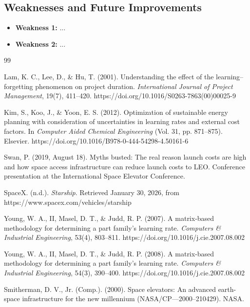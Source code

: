\documentclass{mcmthesis}
\begin{document}
\subsection{Weaknesses and Future Improvements}
\begin{itemize}
    \item \textbf{Weakness 1:} ...
    \item \textbf{Weakness 2:} ...
\end{itemize}

\newpage
\begin{thebibliography}{99}

    Lam, K. C., Lee, D., \& Hu, T. (2001).
    Understanding the effect of the learning--forgetting phenomenon on project duration.
    \textit{International Journal of Project Management}, 19(7), 411--420.
    https://doi.org/10.1016/S0263-7863(00)00025-9

    Kim, S., Koo, J., \& Yoon, E. S. (2012).
    Optimization of sustainable energy planning with consideration of uncertainties in learning rates and external cost factors.
    In \textit{Computer Aided Chemical Engineering} (Vol. 31, pp. 871--875).
    Elsevier.
    https://doi.org/10.1016/B978-0-444-54298-4.50161-6

    Swan, P. (2019, August 18).
    Myths busted: The real reason launch costs are high and how space access infrastructure can reduce launch costs to LEO.
    Conference presentation at the International Space Elevator Conference.

    SpaceX. (n.d.).
    \textit{Starship}.
    Retrieved January 30, 2026, from https://www.spacex.com/vehicles/starship

    Young, W. A., II, Masel, D. T., \& Judd, R. P. (2007).
    A matrix-based methodology for determining a part family’s learning rate.
    \textit{Computers \& Industrial Engineering}, 53(4), 803--811.
    https://doi.org/10.1016/j.cie.2007.08.002

    Young, W. A., II, Masel, D. T., \& Judd, R. P. (2008).
    A matrix-based methodology for determining a part family’s learning rate.
    \textit{Computers \& Industrial Engineering}, 54(3), 390--400.
    https://doi.org/10.1016/j.cie.2007.08.002

    Smitherman, D. V., Jr. (Comp.). (2000). Space elevators: An advanced earth-space infrastructure for the new millennium (NASA/CP—2000–210429). NASA.

\end{thebibliography}
\end{document}
